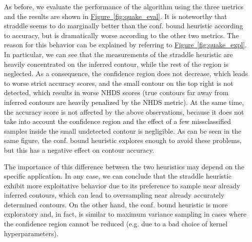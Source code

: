 \documentclass[11pt]{article} %
\newcommand{\figref}[1]{\hyperref[#1]{\mbox{Figure~\ref*{#1}}}}
\begin{document}
As before, we evaluate the performance of the algorithm using the three metrics
and the results are shown in \figref{fig:quake_eval}. It is noteworthy that
straddle seems to do marginally better than the conf. bound heuristic
according to accuracy, but is dramatically worse according to the other two
metrics. The reason for this behavior can be explained by referring to
\figref{fig:quake_expl}. In particular, we can see that the measurements of
the straddle heuristic are heavily concentrated on the inferred contour, while
the rest of the region is neglected. As a consequence, the confidence region
does not decrease, which leads to worse strict accuracy scores, and the small
contour on the top right is not detected, which results in worse NHDS scores
(true contours far away from inferred contours are heavily penalized by the
NHDS metric). At the same time, the accuracy score is not affected by the
above observations, because it does not take into account the confidence
region and the effect of a few missclassified samples inside the small
undetected contour is negligible. As can be seen in the same figure,
the conf. bound heuristic explores enough to avoid these problems, but
this has a negative effect on contour accuracy.

The importance of this difference between the two heuristics may depend on
the specific application. In any
case, we can conclude that the straddle heuristic exhibit more exploitative
behavior due to its preference to sample near already inferred contours, which
can lead to oversampling near already accurately determined contours. On the
other hand, the conf. bound heuristic is more exploratory and, in fact, is
similar to maximum variance sampling in cases where the confidence region
cannot be reduced (e.g. due to a bad choice of kernel hyperparameters).
\end{document}
